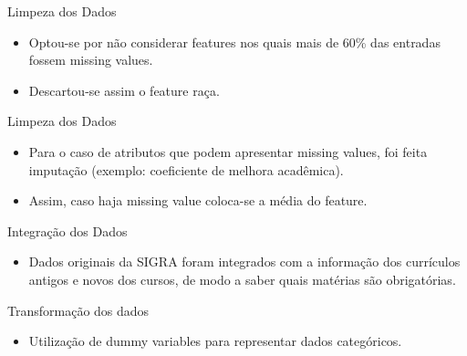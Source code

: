 \begin{frame}{Limpeza dos Dados}
\begin{itemize}[itemsep=3ex]
    \item Optou-se por não considerar features nos quais mais de 60\% das entradas
        fossem missing values.
    \item Descartou-se assim o feature raça.
\end{itemize}
\end{frame}

\begin{frame}{Limpeza dos Dados}
\begin{itemize}[itemsep=3ex]
    \item Para o caso de atributos que podem apresentar missing values, foi feita
        imputação (exemplo: coeficiente de melhora acadêmica).
    \item Assim, caso haja missing value coloca-se a média do feature. 
\end{itemize}
\end{frame}

\begin{frame}{Integração dos Dados}
\begin{itemize}[itemsep=3ex]
    \item Dados originais da SIGRA foram integrados com a informação dos currículos
        antigos e novos dos cursos, de modo a saber quais matérias são obrigatórias. 
\end{itemize}
\end{frame}

\begin{frame}{Transformação dos dados}
\begin{itemize}[itemsep=3ex]
    \item Utilização de dummy variables para representar dados categóricos.  
\end{itemize}
\end{frame}

